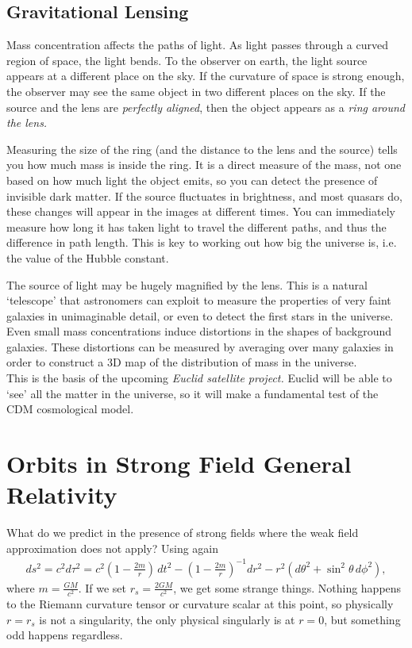 \documentclass[a4paper, 11pt, normalem]{report}
\begin{document}
\section{Gravitational Lensing}
Mass concentration affects the paths of light. 
As light passes through a curved region of space, the light bends. 
To the observer on earth, the light source appears at a different place on the sky. 
If the curvature of space is strong enough, the observer may see the same object in two different places on the sky. 
If the source and the lens are \emph{perfectly aligned}, then the object appears as a \emph{ring around the lens.}

Measuring the size of the ring (and the distance to the lens and the source) tells you how much mass is inside the ring. 
It is a direct measure of the mass, not one based on how much light the object emits, so you can detect the presence of invisible dark matter. 
If the source fluctuates in brightness, and most quasars do, these changes will appear in the images at different times. 
You can immediately measure how long it has taken light to travel the different paths, and thus the difference in path length. 
This is key to working out how big the universe is, i.e. the value of the Hubble constant. 

The source of light may be hugely magnified by the lens. 
This is a natural `telescope' that astronomers can exploit to measure the properties of very faint galaxies in unimaginable detail, or even to detect the first stars in the universe. 
Even small mass concentrations induce distortions in the shapes of background galaxies. 
These distortions can be measured by averaging over many galaxies in order to construct a 3D map of the distribution of mass in the universe. \\
This is the basis of the upcoming \emph{Euclid satellite project.}
Euclid will be able to `see' all the matter in the universe, so it will make a fundamental test of the CDM cosmological model. 

\chapter{Orbits in Strong Field General Relativity}
What do we predict in the presence of strong fields where the weak field approximation does not apply?
Using again
\begin{align}
    ds^2 = c^2d\tau^2 = c^2\left(1-\frac{2m}{r}\right)\,dt^2 - \left(1-\frac{2m}{r}\right)^{-1}dr^2 - r^2\left(d\theta^2+\sin^2\theta\,d\phi^2\right),
\end{align}
where $m=\frac{GM}{c^2}$.
If we set $r_s=\frac{2GM}{c^2}$, we get some strange things. 
Nothing happens to the Riemann curvature tensor or curvature scalar at this point, so physically $r=r_s$ is not a singularity, the only physical singularly is at $r=0$, but something odd happens regardless. 
\end{document}
